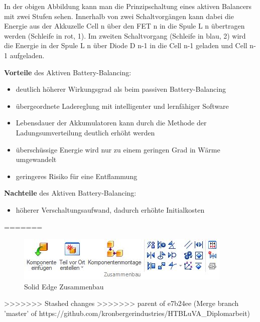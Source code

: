 In der obigen Abbildung kann man die Prinzipschaltung eines aktiven Balancers mit zwei Stufen sehen. Innerhalb von zwei Schaltvorgängen kann dabei die Energie aus der Akkuzelle Cell n über den FET n in die Spule L n übertragen werden (Schleife in rot, 1).
Im zweiten Schaltvorgang (Schleife in blau, 2) wird die Energie in der Spule L n über Diode D n-1 in die Cell n-1 geladen und Cell n-1 aufgeladen.

\textbf{Vorteile} des Aktiven Battery-Balancing:
\begin{itemize}
\item {deutlich höherer Wirkungsgrad als beim passiven Battery-Balancing} \medskip\\
\item {übergeordnete Ladereglung mit intelligenter und lernfähiger Software} \medskip\\
\item {Lebensdauer der Akkumulatoren kann durch die Methode der Ladungsumverteilung deutlich erhöht werden} \medskip\\
\item {überschüssige Energie wird nur zu einem geringen Grad in Wärme umgewandelt} \medskip\\
\item {geringeres Risiko für eine Entflammung} \medskip\\
\end{itemize}

\textbf{Nachteile} des Aktiven Battery-Balancing:
\begin{itemize}
\item {höherer Verschaltungsaufwand, dadurch erhöhte Initialkosten} \medskip\\
\end{itemize}
=======
\begin{figure} [H]
	\begin{center}
		\includegraphics[scale=0.5]{figures/mechanik/Solid Edge_Zusammenbau.jpg}
			\caption{Solid Edge Zusammenbau}
			\label{fig:Solid Edge Zusammenbau}
	\end{center}
\end{figure}
>>>>>>> Stashed changes
>>>>>>> parent of e7b24ee (Merge branch 'master' of https://github.com/kronbergerindustries/HTBLuVA_Diplomarbeit)
